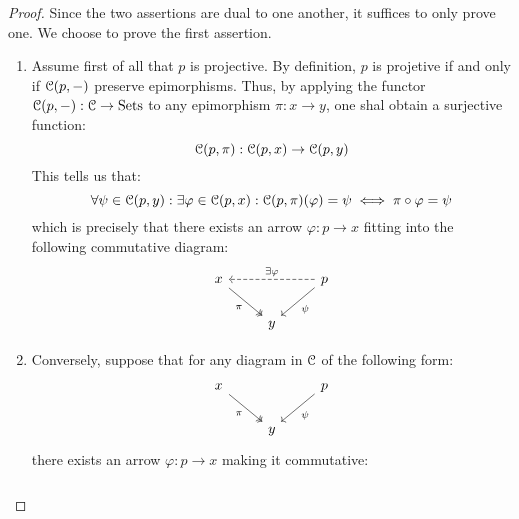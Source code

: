                     \begin{proof}
                        Since the two assertions are dual to one another, it suffices to only prove one. We choose to prove the first assertion.
                            \begin{enumerate}
                                \item Assume first of all that $p$ is projective. By definition, $p$ is projetive if and only if $\C(p, -)$ preserve epimorphisms. Thus, by applying the functor $\C(p, -): \C \to \Sets$ to any epimorphism $\pi: x \to y$, one shal obtain a surjective function:
                                    $$\C(p, \pi): \C(p, x) \to \C(p, y)$$
                                This tells us that:
                                    $$\forall \psi \in \C(p, y): \exists \varphi \in \C(p, x): \C(p, \pi)(\varphi) = \psi \iff \pi \circ \varphi = \psi$$
                                which is precisely that there exists an arrow $\varphi: p \to x$ fitting into the following commutative diagram:
                                    $$
                                        \begin{tikzcd}
                                        	x && p \\
                                        	& y
                                        	\arrow["\pi"', two heads, from=1-1, to=2-2]
                                        	\arrow["\psi", from=1-3, to=2-2]
                                        	\arrow["{\exists \varphi}"', dashed, from=1-3, to=1-1]
                                        \end{tikzcd}
                                    $$
                                \item Conversely, suppose that for any diagram in $\C$ of the following form:
                                    $$
                                        \begin{tikzcd}
                                        	x && p \\
                                        	& y
                                        	\arrow["\pi"', two heads, from=1-1, to=2-2]
                                        	\arrow["\psi", from=1-3, to=2-2]
                                        \end{tikzcd}
                                    $$
                                there exists an arrow $\varphi: p \to x$ making it commutative:
                                    $$
                                        \begin{tikzcd}

\end{tikzcd}$$
\end{enumerate}
\end{proof}
